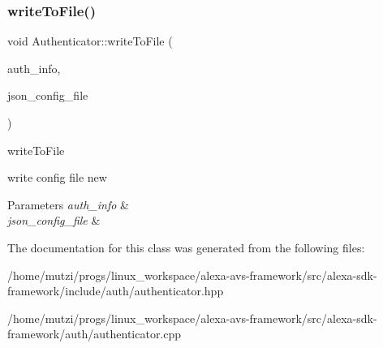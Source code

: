 \subsubsection{\texorpdfstring{write\+To\+File()}{writeToFile()}}
{\footnotesize\ttfamily void Authenticator\+::write\+To\+File (\begin{DoxyParamCaption}\item[{\hyperlink{classAuth_1_1AuthInfo}{Auth\+Info} $\ast$}]{auth\+\_\+info,  }\item[{std\+::string}]{json\+\_\+config\+\_\+file }\end{DoxyParamCaption})}



write\+To\+File 

write config file new 
\begin{DoxyParams}{Parameters}
{\em auth\+\_\+info} & \\
\hline
{\em json\+\_\+config\+\_\+file} & \\
\hline
\end{DoxyParams}


The documentation for this class was generated from the following files\+:\begin{DoxyCompactItemize}
\item 
/home/mutzi/progs/linux\+\_\+workspace/alexa-\/avs-\/framework/src/alexa-\/sdk-\/framework/include/auth/authenticator.\+hpp\item 
/home/mutzi/progs/linux\+\_\+workspace/alexa-\/avs-\/framework/src/alexa-\/sdk-\/framework/auth/authenticator.\+cpp\end{DoxyCompactItemize}
